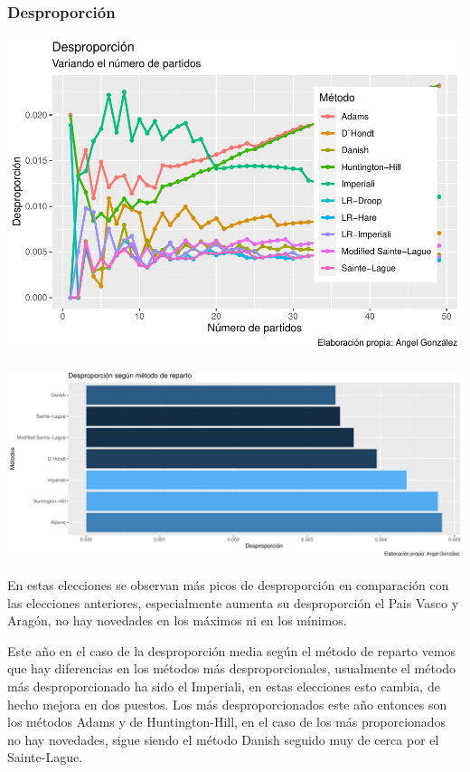 \documentclass[12pt,a4paper,]{book}
\numberwithin{dummy}{section}
\theoremstyle{ocrenumbox}
\theoremstyle{blacknumex}
\theoremstyle{blacknumbox}
\theoremstyle{ocrenum}
\theoremstyle{ocrenum}
\begin{document}
\hypertarget{desproporciuxf3n-5}{%
\subsubsection{Desproporción}\label{desproporciuxf3n-5}}

\begin{center}\includegraphics[width=0.95\linewidth]{figurasR/unnamed-chunk-57-1} \end{center}

\begin{center}\includegraphics[width=0.95\linewidth]{figurasR/unnamed-chunk-57-2} \end{center}

En estas elecciones se observan más picos de desproporción en
comparación con las elecciones anteriores, especialmente aumenta su
desproporción el Pais Vasco y Aragón, no hay novedades en los máximos ni
en los mínimos.

Este año en el caso de la desproporción media según el método de reparto
vemos que hay diferencias en los métodos más desproporcionales,
usualmente el método más desproporcionado ha sido el Imperiali, en estas
elecciones esto cambia, de hecho mejora en dos puestos. Los más
desproporcionados este año entonces son los métodos Adams y de
Huntington-Hill, en el caso de los más proporcionados no hay novedades,
sigue siendo el método Danish seguido muy de cerca por el Sainte-Lague.
\end{document}
